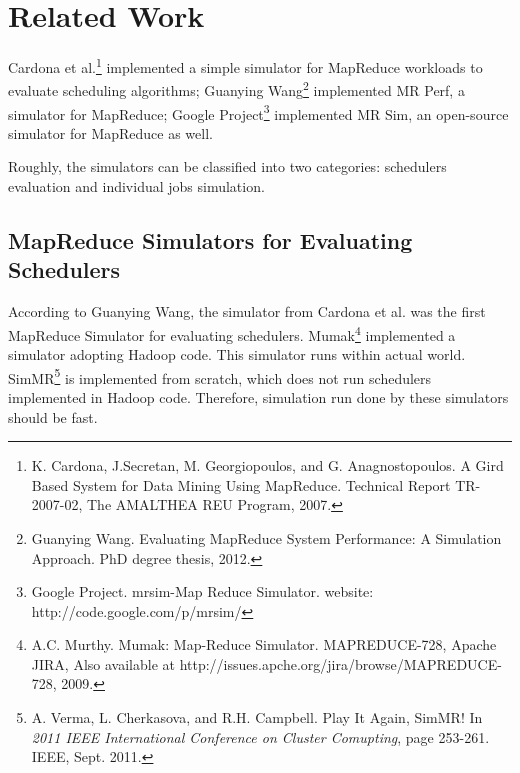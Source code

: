 \documentclass{Project}
\begin{document}
\section{Related Work}
Cardona et al.\footnote{K. Cardona, J.Secretan, M. Georgiopoulos, and G. Anagnostopoulos. A Gird Based System for Data Mining Using MapReduce. Technical Report TR-2007-02, The AMALTHEA REU Program, 2007.} implemented a simple simulator for MapReduce workloads to evaluate scheduling algorithms; Guanying Wang\footnote{Guanying Wang. Evaluating MapReduce System Performance: A Simulation Approach. PhD degree thesis, 2012.} implemented MR Perf, a simulator for MapReduce; Google Project\footnote{Google Project. mrsim-Map Reduce Simulator. website: http://code.google.com/p/mrsim/} implemented MR Sim, an open-source simulator for MapReduce as well.\par
Roughly, the simulators can be classified into two categories: schedulers evaluation and individual jobs simulation.
\subsection{MapReduce Simulators for Evaluating Schedulers}
According to Guanying Wang, the simulator from Cardona et al. was the first MapReduce Simulator for evaluating schedulers. Mumak\footnote{A.C. Murthy. Mumak: Map-Reduce Simulator. MAPREDUCE-728, Apache JIRA, Also available at http://issues.apche.org/jira/browse/MAPREDUCE-728, 2009.} implemented a simulator adopting Hadoop code. This simulator runs within actual world. SimMR\footnote{A. Verma, L. Cherkasova, and R.H. Campbell. Play It Again, SimMR! In \emph{2011 IEEE International Conference on Cluster Comupting}, page 253-261. IEEE, Sept. 2011.} is implemented from scratch, which does not run schedulers implemented in Hadoop code. Therefore, simulation run done by these simulators should be fast.
\end{document}
